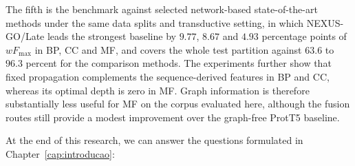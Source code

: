\documentclass[Ingles]{ic-tese-v3}
\begin{document}
The fifth is the benchmark against selected network-based state-of-the-art methods under the
same data splits and transductive setting, in which NEXUS-GO/Late leads the strongest
baseline by $9.77$, $8.67$ and $4.93$ percentage points of $wF_{\max}$ in BP, CC and MF, and
covers the whole test partition against $63.6$ to $96.3$ percent for the comparison methods.
The experiments further show that fixed propagation complements the sequence-derived features
in BP and CC, whereas its optimal depth is zero in MF. Graph information is therefore
substantially less useful for MF on the corpus evaluated here, although the fusion routes still
provide a modest improvement over the graph-free ProtT5 baseline.

At the end of this research, we can answer the questions formulated in
Chapter~\ref{cap:introducao}:
\end{document}

